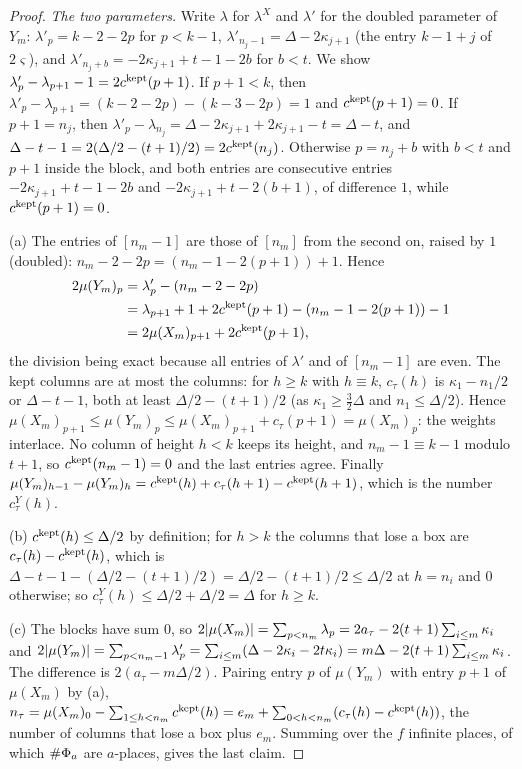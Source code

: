 \begin{proof}
\emph{The two parameters.} Write $\lambda$ for $\lambda^X$ and $\lambda'$ for the doubled parameter of $Y_m$: $\lambda'_p=k-2-2p$ for $p<k-1$, $\lambda'_{n_j-1}=\Delta-2\kappa_{j+1}$ (the entry $k-1+j$ of $2\varsigma$), and $\lambda'_{n_j+b}=-2\kappa_{j+1}+t-1-2b$ for $b<t$. We show $\lambda'_p-\lambda_{p+1}-1=2c^{\rm kept}(p+1)$. If $p+1<k$, then
$\lambda'_p-\lambda_{p+1}=(k-2-2p)-(k-3-2p)=1$ and $c^{\rm kept}(p+1)=0$. If $p+1=n_j$, then $\lambda'_p-\lambda_{n_j}=\Delta-2\kappa_{j+1}+2\kappa_{j+1}-t=\Delta-t$, and $\Delta-t-1=2(\Delta/2-(t+1)/2)=2c^{\rm kept}(n_j)$. Otherwise $p=n_j+b$ with $b<t$ and $p+1$ inside the block, and both entries are
consecutive entries $-2\kappa_{j+1}+t-1-2b$ and $-2\kappa_{j+1}+t-2(b+1)$, of difference $1$, while $c^{\rm kept}(p+1)=0$.

(a) The entries of $[n_m-1]$ are those of $[n_m]$ from the second on, raised by $1$ (doubled): $n_m-2-2p=(n_m-1-2(p+1))+1$. Hence
\begin{align*}2\mu(Y_m)_p&=\lambda'_p-(n_m-2-2p)\\&=\lambda_{p+1}+1+2c^{\rm kept}(p+1)-(n_m-1-2(p+1))-1\\&=2\mu(X_m)_{p+1}+2c^{\rm kept}(p+1),\end{align*}
the division being exact because all entries of $\lambda'$ and of $[n_m-1]$ are even. The kept columns are at most the columns: for $h\ge k$ with $h\equiv k$, $c_\tau(h)$ is $\kappa_1-n_1/2$ or $\Delta-t-1$, both at least $\Delta/2-(t+1)/2$ (as $\kappa_1\ge\frac32\Delta$ and $n_1\le\Delta/2$). Hence
$\mu(X_m)_{p+1}\le\mu(Y_m)_p\le\mu(X_m)_{p+1}+c_\tau(p+1)=\mu(X_m)_p$: the weights interlace. No column of height $h<k$ keeps its height, and $n_m-1\equiv k-1$ modulo $t+1$, so $c^{\rm kept}(n_m-1)=0$ and the last entries agree. Finally $\mu(Y_m)_{h-1}-\mu(Y_m)_h=c^{\rm kept}(h)+c_\tau(h+1)-c^{\rm kept}(h+1)$, which is the
number $c^Y_\tau(h)$.

(b) $c^{\rm kept}(h)\le\Delta/2$ by definition; for $h>k$ the columns that lose a box are $c_\tau(h)-c^{\rm kept}(h)$, which is $\Delta-t-1-(\Delta/2-(t+1)/2)=\Delta/2-(t+1)/2\le\Delta/2$ at $h=n_i$ and $0$ otherwise; so $c^Y_\tau(h)\le\Delta/2+\Delta/2=\Delta$ for $h\ge k$.

(c) The blocks have sum $0$, so $2\lvert \mu(X_m)\rvert=\sum_{p<n_m}\lambda_p=2a_\tau-2(t+1)\sum_{i\le m}\kappa_i$ and $2\lvert \mu(Y_m)\rvert=\sum_{p<n_m-1}\lambda'_p=\sum_{i\le m}(\Delta-2\kappa_i-2t\kappa_i)=m\Delta-2(t+1)\sum_{i\le m}\kappa_i$. The difference is $2(a_\tau-m\Delta/2)$. Pairing entry $p$ of $\mu(Y_m)$ with entry $p+1$ of
$\mu(X_m)$ by (a), $n_\tau=\mu(X_m)_0-\sum_{1\le h<n_m}c^{\rm kept}(h)=e_m+\sum_{0<h<n_m}(c_\tau(h)-c^{\rm kept}(h))$, the number of columns that lose a box plus $e_m$. Summing over the $f$ infinite places, of which $\#\Phi_a$ are $a$-places, gives the last claim.
\end{proof}

